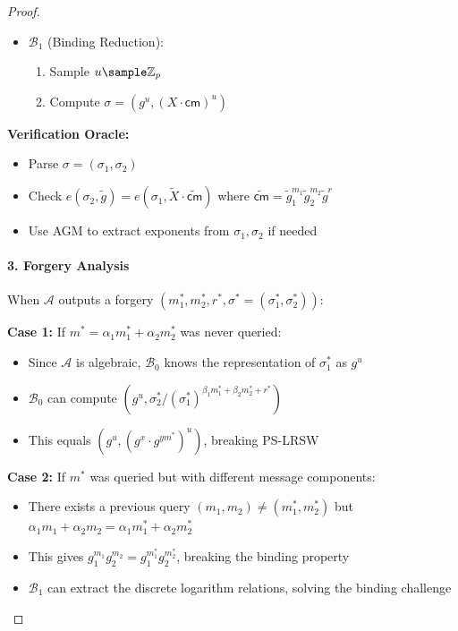 \begin{proof}
\begin{itemize}
    \item $\mathcal{B}_1$ (Binding Reduction):
    \begin{enumerate}
        \item Sample $u \sample \Z_p$
        \item Compute $\sigma = (g^u, (X \cdot \mathsf{cm})^u)$
    \end{enumerate}
\end{itemize}

\noindent \textbf{Verification Oracle:}

\begin{itemize}
    \item Parse $\sigma = (\sigma_1, \sigma_2)$
    \item Check $e(\sigma_2, \tilde{g}) = e(\sigma_1, \tilde{X} \cdot \widetilde{\mathsf{cm}})$ where $\widetilde{\mathsf{cm}} = \tilde{g}_1^{m_1}\tilde{g}_2^{m_2}\tilde{g}^r$
    \item Use AGM to extract exponents from $\sigma_1, \sigma_2$ if needed
\end{itemize}

\paragraph{3. Forgery Analysis}
When $\mathcal{A}$ outputs a forgery $(m_1^*, m_2^*, r^*, \sigma^* = (\sigma_1^*, \sigma_2^*))$:

\textbf{Case 1:} If $m^* = \alpha_1m_1^* + \alpha_2m_2^*$ was never queried:
\begin{itemize}
    \item Since $\mathcal{A}$ is algebraic, $\mathcal{B}_0$ knows the representation of $\sigma_1^*$ as $g^u$
    \item $\mathcal{B}_0$ can compute $(g^u, \sigma_2^* / (\sigma_1^*)^{\beta_1m_1^* + \beta_2m_2^* + r^*})$
    \item This equals $(g^u, (g^x \cdot g^{ym^*})^u)$, breaking PS-LRSW
\end{itemize}

\textbf{Case 2:} If $m^*$ was queried but with different message components:
\begin{itemize}
    \item There exists a previous query $(m_1, m_2) \neq (m_1^*, m_2^*)$ but $\alpha_1m_1 + \alpha_2m_2 = \alpha_1m_1^* + \alpha_2m_2^*$
    \item This gives $g_1^{m_1}g_2^{m_2} = g_1^{m_1^*}g_2^{m_2^*}$, breaking the binding property
    \item $\mathcal{B}_1$ can extract the discrete logarithm relations, solving the binding challenge
\end{itemize}
\end{proof}



